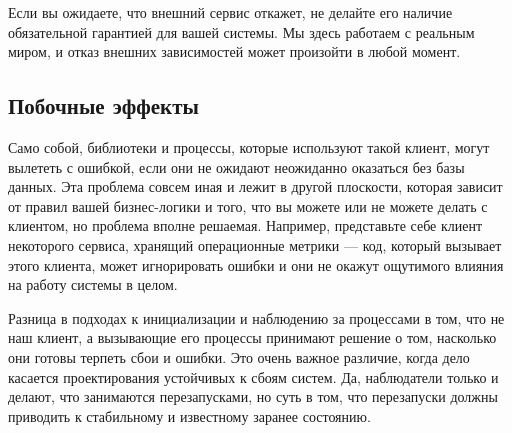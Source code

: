 \documentclass[11pt, oneside]{book}   	%
\begin{document}
Если вы ожидаете, что внешний сервис откажет, не делайте его наличие обязательной гарантией для вашей системы. Мы здесь работаем с реальным миром, и отказ внешних зависимостей может произойти в любой момент.


\subsection{Побочные эффекты}
\label{subsec:start-link-side-effects}

Само собой, библиотеки и процессы, которые используют такой клиент, могут вылететь с ошибкой, если они не ожидают неожиданно оказаться без базы данных. Эта проблема совсем иная и лежит в другой плоскости, которая зависит от правил вашей бизнес-логики и того, что вы можете или не можете делать с клиентом, но проблема вполне решаемая. Например, представьте себе клиент некоторого сервиса, хранящий операционные метрики --- код, который вызывает этого клиента, может игнорировать ошибки и они не окажут ощутимого влияния на работу системы в целом.

Разница в подходах к инициализации и наблюдению за процессами в том, что не наш клиент, а вызывающие его процессы принимают решение о том, насколько они готовы терпеть сбои и ошибки. Это очень важное различие, когда дело касается проектирования устойчивых к сбоям систем. Да, наблюдатели только и делают, что занимаются перезапусками, но суть в том, что перезапуски должны приводить к стабильному и известному заранее состоянию.
\end{document}
